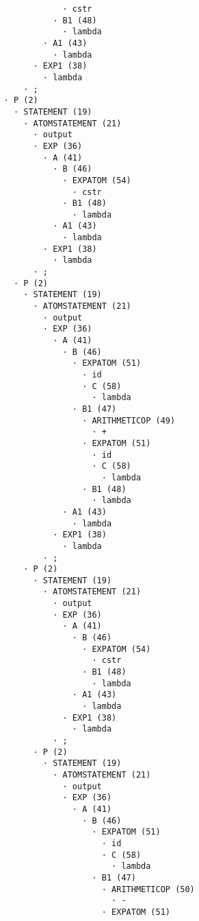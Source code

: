 \begin{enumerate}
\begin{tcolorbox}[title={Árbol sintáctico generado con la herramienta VASt}, colback=white, breakable]
\begin{lstlisting}
                      · cstr
                    · B1 (48)
                      · lambda
                  · A1 (43)
                    · lambda
                · EXP1 (38)
                  · lambda
              · ;
          · P (2)
            · STATEMENT (19)
              · ATOMSTATEMENT (21)
                · output
                · EXP (36)
                  · A (41)
                    · B (46)
                      · EXPATOM (54)
                        · cstr
                      · B1 (48)
                        · lambda
                    · A1 (43)
                      · lambda
                  · EXP1 (38)
                    · lambda
                · ;
            · P (2)
              · STATEMENT (19)
                · ATOMSTATEMENT (21)
                  · output
                  · EXP (36)
                    · A (41)
                      · B (46)
                        · EXPATOM (51)
                          · id
                          · C (58)
                            · lambda
                        · B1 (47)
                          · ARITHMETICOP (49)
                            · +
                          · EXPATOM (51)
                            · id
                            · C (58)
                              · lambda
                          · B1 (48)
                            · lambda
                      · A1 (43)
                        · lambda
                    · EXP1 (38)
                      · lambda
                  · ;
              · P (2)
                · STATEMENT (19)
                  · ATOMSTATEMENT (21)
                    · output
                    · EXP (36)
                      · A (41)
                        · B (46)
                          · EXPATOM (54)
                            · cstr
                          · B1 (48)
                            · lambda
                        · A1 (43)
                          · lambda
                      · EXP1 (38)
                        · lambda
                    · ;
                · P (2)
                  · STATEMENT (19)
                    · ATOMSTATEMENT (21)
                      · output
                      · EXP (36)
                        · A (41)
                          · B (46)
                            · EXPATOM (51)
                              · id
                              · C (58)
                                · lambda
                            · B1 (47)
                              · ARITHMETICOP (50)
                                · -
                              · EXPATOM (51)

\end{lstlisting}
\end{tcolorbox}
\end{enumerate}
